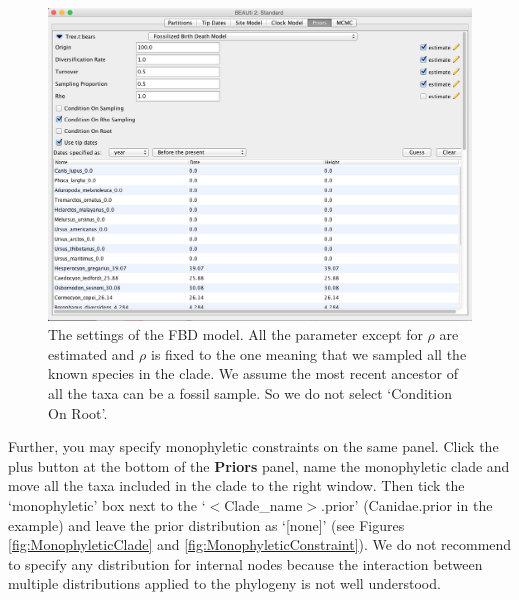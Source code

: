 \documentclass[12pt]{article}
\begin{document}
\begin{figure}	
\centering
\includegraphics[width=\textwidth]{figures/FBDsettings}
\caption{The settings of the FBD model. All the parameter except for $\rho$ are estimated and $\rho$ is fixed to the one meaning that we sampled all the known species in the clade. We assume the most recent ancestor of all the taxa can be a fossil sample. So we do not select `Condition On Root'. \label{fig:FBDsettings}}
\label{fig:BEAUti_ImportNexus}
\end{figure}

Further, you may specify monophyletic constraints on the same panel. Click the plus button at the bottom of the {\bf Priors} panel, name the monophyletic clade and move all the taxa included in the clade to the right window. Then tick the `monophyletic' box next to the `$<$Clade\_name$>$.prior' (Canidae.prior in the example) and leave the prior distribution as `[none]' (see Figures \ref{fig:MonophyleticClade} and \ref{fig:MonophyleticConstraint}). We do not recommend to specify any distribution for internal nodes because the interaction between multiple distributions applied to the phylogeny is not well understood.
 
\end{document}
